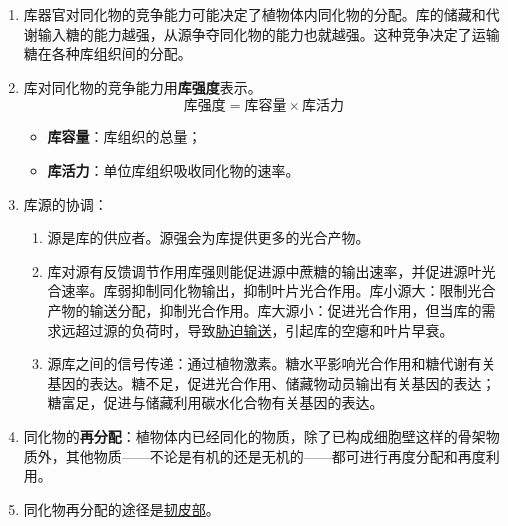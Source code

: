 \begin{enumerate}
    \item 库器官对同化物的竞争能力可能决定了植物体内同化物的分配。库的储藏和代谢输入糖的能力越强，从源争夺同化物的能力也就越强。这种竞争决定了运输糖在各种库组织间的分配。
    \item 库对同化物的竞争能力用\textbf{库强度}表示。
    \[
        \text{库强度}=\text{库容量}\times\text{库活力}
    \]
    \begin{itemize}
        \item \textbf{库容量}：库组织的总量；
        \item \textbf{库活力}：单位库组织吸收同化物的速率。
    \end{itemize}
    \item 库源的协调：
    \begin{enumerate}
        \item 源是库的供应者。源强会为库提供更多的光合产物。
        \item 库对源有反馈调节作用库强则能促进源中蔗糖的输出速率，并促进源叶光合速率。库弱抑制同化物输出，抑制叶片光合作用。库小源大：限制光合产物的输送分配，抑制光合作用。库大源小：促进光合作用，但当库的需求远超过源的负荷时，导致\uline{胁迫输送}，引起库的空瘪和叶片早衰。
        \item 源库之间的信号传递：通过植物激素。糖水平影响光合作用和糖代谢有关基因的表达。糖不足，促进光合作用、储藏物动员输出有关基因的表达；糖富足，促进与储藏利用碳水化合物有关基因的表达。
    \end{enumerate}
    \item 同化物的\textbf{再分配}：植物体内已经同化的物质，除了已构成细胞壁这样的骨架物质外，其他物质——不论是有机的还是无机的——都可进行再度分配和再度利用。
    \item 同化物再分配的途径是\uline{韧皮部}。
\end{enumerate}